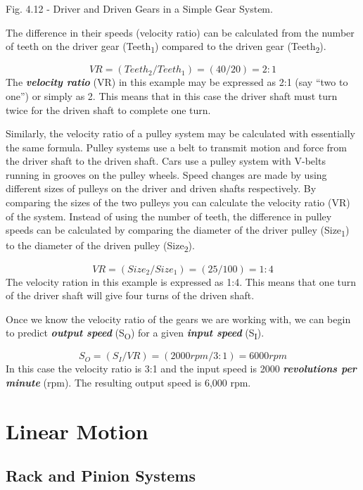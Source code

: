\documentclass[
]{book}
\begin{document}
Fig. 4.12 - Driver and Driven Gears in a Simple Gear System.

The difference in their speeds (velocity ratio) can be calculated from the number of teeth on the driver gear (Teeth\textsubscript{1}) compared to the driven gear (Teeth\textsubscript{2}).

\[VR = (Teeth_2/Teeth_1) = (40/20) = 2:1\]
The \textbf{\emph{velocity ratio}} (VR) in this example may be expressed as 2:1 (say ``two to one'') or simply as 2. This means that in this case the driver shaft must turn twice for the driven shaft to complete one turn.

Similarly, the velocity ratio of a pulley system may be calculated with essentially the same formula. Pulley systems use a belt to transmit motion and force from the driver shaft to the driven shaft. Cars use a pulley system with V-belts running in grooves on the pulley wheels. Speed changes are made by using different sizes of pulleys on the driver and driven shafts respectively. By comparing the sizes of the two pulleys you can calculate the velocity ratio (VR) of the system. Instead of using the number of teeth, the difference in pulley speeds can be calculated by comparing the diameter of the driver pulley (Size\textsubscript{1}) to the diameter of the driven pulley (Size\textsubscript{2}).

\[VR = (Size_2/Size_1)=(25/100)=1:4\]
The velocity ration in this example is expressed as 1:4. This means that one turn of the driver shaft will give four turns of the driven shaft.

Once we know the velocity ratio of the gears we are working with, we can begin to predict \textbf{\emph{output speed}} (S\textsubscript{O}) for a given \textbf{\emph{input speed}} (S\textsubscript{I}).

\[S_O=(S_I/VR)=(2000rpm/3:1)=6000rpm\]
In this case the velocity ratio is 3:1 and the input speed is 2000 \textbf{\emph{revolutions per minute}} (rpm). The resulting output speed is 6,000 rpm.

\hypertarget{linear-motion}{%
\section{Linear Motion}\label{linear-motion}}

\hypertarget{rack-and-pinion-systems}{%
\subsection{Rack and Pinion Systems}\label{rack-and-pinion-systems}}
\end{document}
